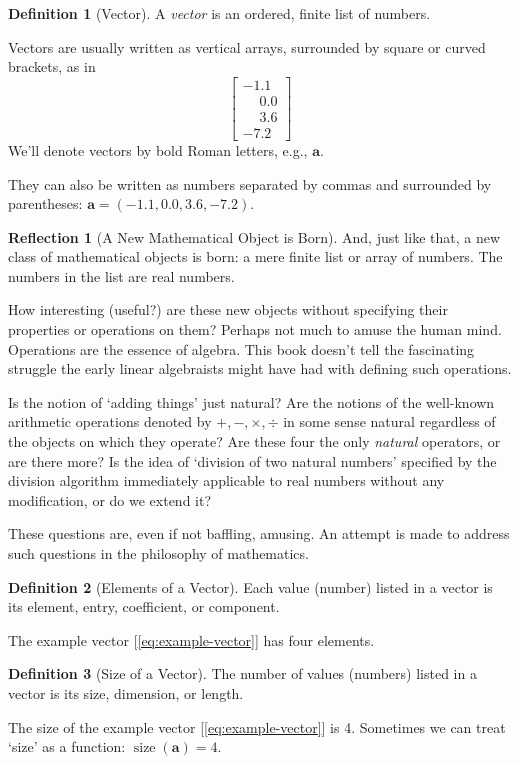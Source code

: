 \documentclass[11pt]{book}
\theoremstyle{definition}
\newtheorem{definition}{Definition}
\theoremstyle{plain}
\theoremstyle{problemstyle}
\theoremstyle{remark}
\theoremstyle{definition}
\newtheorem{reflection}{Reflection}
\DeclareMathOperator{\size}{size}
\newcommand{\sizea}{\size(\boldsymbol{a})}
\begin{document}
\begin{definition}[Vector]
    \label{def:vector}
    A \emph{vector} is an ordered, finite list of numbers. 

    Vectors are usually written as vertical arrays, surrounded by square or curved brackets, as in
    \begin{equation}
        \label{eq:example-vector}
    \begin{bmatrix}
        -1.1\\
        \phantom{-}0.0\\
        \phantom{-}3.6\\
        -7.2
    \end{bmatrix}
    \end{equation}
    We'll denote vectors by bold Roman letters, e.g., $\boldsymbol{a}$.

    They can also be written as numbers separated by commas and surrounded by parentheses: $\boldsymbol{a}=(-1.1,0.0,3.6,-7.2)$.
\end{definition}

\begin{reflection}[A New Mathematical Object is Born]
    And, just like that, a new class of mathematical objects is born: a mere finite list or array of numbers. The numbers in the list are real numbers. 

    How interesting (useful?) are these new objects without specifying their properties or operations on them? Perhaps not much to amuse the human mind. Operations are the essence of algebra. This book doesn't tell the fascinating struggle the early linear algebraists might have had with defining such operations.

    Is the notion of `adding things' just natural? Are the notions of the well-known arithmetic operations denoted by $+,-,\times,\div$ in some sense natural regardless of the objects on which they operate? Are these four the only \emph{natural} operators, or are there more? Is the idea of `division of two natural numbers' specified by the division algorithm immediately applicable to real numbers without any modification, or do we extend it?

    These questions are, even if not baffling, amusing. An attempt is made to address such questions in the philosophy of mathematics. 
\end{reflection}
\begin{definition}[Elements of a Vector]
    \label{def:elements-of-a-vector}
    Each value (number) listed in a vector is its element, entry, coefficient, or component.

    The example vector [\ref{eq:example-vector}] has four elements. 
\end{definition}
\begin{definition}[Size of a Vector]
    \label{def:size-of-a-vector}
    The number of values (numbers) listed in a vector is its size, dimension, or length.

    The size of the example vector [\ref{eq:example-vector}] is 4. Sometimes we can treat `size' as a function: $\sizea=4$.
\end{definition}
\end{document}
